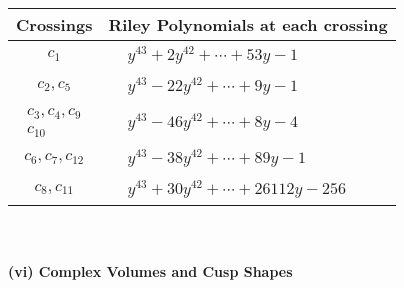 \documentclass[1p]{elsarticle_modified}
\theoremstyle{definition}
\begin{document}
\begin{tabular}{m{50pt}|m{274pt}}
Crossings & \hspace{64pt}Riley Polynomials at each crossing \\
\hline $$\begin{aligned}c_{1}\end{aligned}$$&$\begin{aligned}
&y^{43}+2 y^{42}+\cdots+53 y-1
\end{aligned}$\\
\hline $$\begin{aligned}c_{2},c_{5}\end{aligned}$$&$\begin{aligned}
&y^{43}-22 y^{42}+\cdots+9 y-1
\end{aligned}$\\
\hline $$\begin{aligned}c_{3},c_{4},c_{9}\\c_{10}\end{aligned}$$&$\begin{aligned}
&y^{43}-46 y^{42}+\cdots+8 y-4
\end{aligned}$\\
\hline $$\begin{aligned}c_{6},c_{7},c_{12}\end{aligned}$$&$\begin{aligned}
&y^{43}-38 y^{42}+\cdots+89 y-1
\end{aligned}$\\
\hline $$\begin{aligned}c_{8},c_{11}\end{aligned}$$&$\begin{aligned}
&y^{43}+30 y^{42}+\cdots+26112 y-256
\end{aligned}$\\
\hline
\end{tabular}\\~\\
\newpage\flushleft \textbf{(vi) Complex Volumes and Cusp Shapes}
\end{document}
